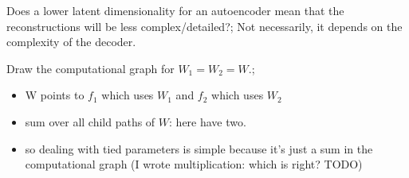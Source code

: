 \documentclass{article}
\begin{document}
Does a lower latent dimensionality for an autoencoder mean that the reconstructions will be less complex/detailed?; Not necessarily, it depends on the complexity of the decoder.

Draw the computational graph for $W_1 = W_2 = W$.; \begin{itemize}
    \item W points to $f_1$ which uses $W_1$ and $f_2$ which uses $W_2$
    \item sum over all child paths of $W$: here have two.
    \item so dealing with tied parameters is simple because it's just a sum in the computational graph (I wrote multiplication: which is right? TODO)
\end{itemize}

\end{document}
